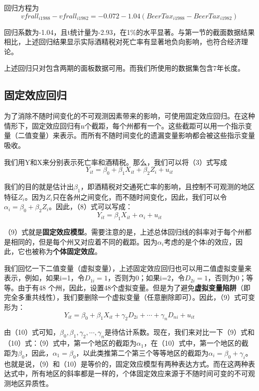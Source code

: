 \documentclass[cn,12pt,math=newtx,citestyle=gb7714-2015,bibstyle=gb7714-2015]{elegantbook}
\begin{document}
回归方程为
\begin{equation}
	vfrall_{i1988}-vfrall_{i1982}=-0.072-1.04(BeerTax_{i1988}-BeerTax_{i1982})
\end{equation}

回归系数为-1.04，且t统计量为-2.93，在1\%的水平显著。与第一节的截面数据结果相比，上述回归结果显示实际酒精税对死亡率有显著地负向影响，也符合经济理论。

上述回归只对包含两期的面板数据可用。而我们所使用的数据集包含7年长度。

\subsection{固定效应回归}

为了消除不随时间变化的不可观测因素带来的影响，可使用固定效应回归。在这种情形下，固定效应回归有n个截距，每个州都有一个。这些截距可以用一个指示变量（二值变量）来表示。而所有不随时间变化的遗漏变量影响都会被这些指示变量吸收。

我们用Y和X来分别表示死亡率和酒精税。那么，我们可以将（3）式写成
\begin{equation}
	Y_{it}=\beta_{0}+\beta_{1}X_{it}+\beta_{2}Z_i+u_{it}
\end{equation}

我们的目的就是估计出$\beta_1$，即酒精税对交通死亡率的影响，且控制不可观测的地区特征$Z_i$。因为$Z_i$只在各州之间变化，而不随时间变化，因此，我们可以令$\alpha_i=\beta_0+\beta_{2}Z_i$。因此，（8）式可以写成：
\begin{equation}
	Y_{it}=\beta_{1}X_{it}+\alpha_i+u_{it}
\end{equation}

（9）式就是\textbf{固定效应模型}。需要注意的是，上述总体回归线的斜率对于每个州都是相同的，但是每个州又对应着不同的截距。因为$\alpha_i$考虑的是个体i的效应，因此，它也被称为\textbf{个体固定效应}。

我们回忆一下二值变量（虚拟变量），上述固定效应回归也可以用二值虚拟变量来表示，例如，如果i=1，令$D_{1i}=1$，否则为0；如果i=2，令$D_{2i}=1$，否则为0；等等。由于有48 个州，因此，设置48个虚拟变量。但是为了避免\textbf{虚拟变量陷阱}（即完全多重共线性），我们要删除一个虚拟变量（任意删除即可）。因此，（9）式可变形为：
\begin{equation}
	Y_{it}=\beta_{0}+\beta_{1}X_{it}+\gamma_2D_{2i}+\cdots+\gamma_nD_{ni}+u_{it}
\end{equation}

由（10）式可知，$\beta_0,\beta_1,\gamma_2,\cdots,\gamma_n$是待估计系数。现在，我们来对比一下（9）式和（10）式：（9）式中，第一个地区的截距为$\alpha_1$，在（10）式中，第一个地区的截距为$\beta_{0}$，因此，$\alpha_1=\beta_{0}$，以此类推第二个第三个等等地区的截距为$\alpha_i=\beta_0+\gamma_i$。也就是说，（9）和（10）是等价的，固定效应模型有两种表达方式。而在这两种表达式中，所有地区的斜率都是一样的，个体固定效应来源于不随时间可变的不可观测地区异质性。
\end{document}

